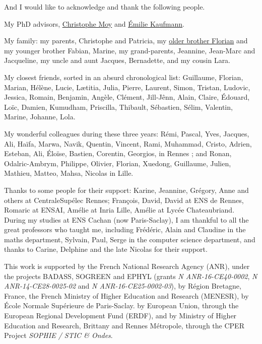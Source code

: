 
\begin{acknowledgements}


And I would like to acknowledge and thank the following people.

My PhD advisors, \href{https://moychristophe.wordpress.com/}{Christophe Moy} and \href{http://chercheurs.lille.inria.fr/ekaufman/research.html}{Émilie Kaufmann}.

My family: my parents, Christophe and Patricia, my \href{https://paris-sorbonne.academia.edu/FBesson}{older brother Florian} and my younger brother Fabian, Marine, my grand-parents, Jeannine, Jean-Marc and Jacqueline, my uncle and aunt Jacques, Bernadette, and my cousin Lara.

My closest friends, sorted in an absurd chronological list: Guillaume, Florian, Marian, Hélène, Lucie, Lætitia, Julia, Pierre, Laurent, Simon, Tristan, Ludovic, Jessica, Romain, Benjamin, Angèle, Clément, Jill-Jênn, Alain, Claire, Édouard, Loïc, Damien, Kumudham, Priscilla, Thibault, Sébastien, Sélim, Valentin, Marine, Johanne, Lola.

My wonderful colleagues during these three years: Rémi, Pascal, Yves, Jacques, Ali, Haïfa, Marwa, Navik, Quentin, Vincent, Rami, Muhammad, Cristo, Adrien, Esteban, Ali, Éloïse, Bastien, Corentin, Georgios, in Rennes ; and Ronan, Odalric-Ambrym, Philippe, Olivier, Florian, Xuedong, Guillaume, Julien, Mathieu, Matteo, Mahsa, Nicolas in Lille.

Thanks to some people for their support: Karine, Jeannine, Grégory, Anne and others at CentraleSupélec Rennes; François, David, David at ENS de Rennes, Romaric at ENSAI, Amélie at Inria Lille, Amélie at Lycée Chateaubriand.
During my studies at ENS Cachan (now Paris-Saclay), I am thankful to all the great professors who taught me, including Frédéric, Alain and Claudine in the maths department, Sylvain, Paul, Serge in the computer science department, and thanks to Carine, Delphine and the late Nicolas for their support.



This work is supported by
the French National Research Agency (ANR), under the projects BADASS, SOGREEN and EPHYL (grants \emph{N ANR-16-CE40-0002}, \emph{N ANR-14-CE28-0025-02} and \emph{N ANR-16-CE25-0002-03}),
by R\'egion Bretagne, France,
the French Ministry of Higher Education and Research (MENESR),
by \'Ecole Normale Sup\'erieure de Paris-Saclay.
by European Union, through the European Regional Development Fund (ERDF),
and by Ministry of Higher Education and Research, Brittany and Rennes Métropole, through the CPER Project \emph{SOPHIE / STIC \& Ondes}.



\end{acknowledgements}
